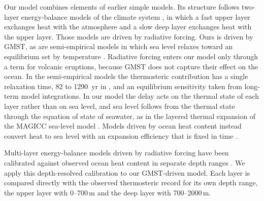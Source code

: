 \documentclass[draft,linenumbers]{agujournal2025}
\begin{document}
Our model combines elements of earlier simple models. Its structure follows two-layer energy-balance models of the climate system \citep{Gregory2000,Held2010,Geoffroy2013}, in which a fast upper layer exchanges heat with the atmosphere and a slow deep layer exchanges heat with the upper layer. Those models are driven by radiative forcing. Ours is driven by GMST, as are semi-empirical models in which sea level relaxes toward an equilibrium set by temperature \citep{Grinsted2010,Mengel2016,Wong2017}. Radiative forcing enters our model only through a term for volcanic eruptions, because GMST does not capture their effect on the ocean. In the semi-empirical models the thermosteric contribution has a single relaxation time, 82 to 1290~yr in \citet{Mengel2016}, and an equilibrium sensitivity taken from long-term model integrations. In our model the delay acts on the thermal state of each layer rather than on sea level, and sea level follows from the thermal state through the equation of state of seawater, as in the layered thermal expansion of the MAGICC sea-level model \citep{Nauels2017}. Models driven by ocean heat content instead convert heat to sea level with an expansion efficiency that is fixed in time \citep{Kuhlbrodt2012,Fox-Kemper2021}.

Multi-layer energy-balance models driven by radiative forcing have been calibrated against observed ocean heat content in separate depth ranges \citep{Skeie2014,Nadiga2019}. We apply this depth-resolved calibration to our GMST-driven model. Each layer is compared directly with the observed thermosteric record for its own depth range, the upper layer with 0--700\,m and the deep layer with 700--2000\,m.
\end{document}
